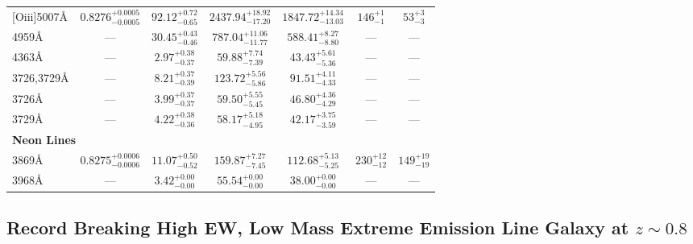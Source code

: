 \documentclass[twocolumn,tight,times,linenumbers]{aastex631}
\newcommand{\oii}{[O{\sc ii}]}
\newcommand{\oiii}{[O{\sc iii}]}
\newcommand{\neiii}{[Ne{\sc iii}]}
\begin{document}
\begin{table}
\begin{tabular*}{\textwidth}{@{\extracolsep{\fill}}lcccccc}
			\oiii5007\AA & $0.8276^{+0.0005}_{-0.0005}$ & $92.12^{+0.72}_{-0.65}$ & $2437.94^{+18.92}_{-17.20}$ & $1847.72^{+14.34}_{-13.03}$ & $146^{+1}_{-1}$ & $53^{+3}_{-3}$ \\
				\oiii4959\AA & --- & $30.45^{+0.43}_{-0.46}$ & $787.04^{+11.06}_{-11.77}$ & $588.41^{+8.27}_{-8.80}$ & --- & --- \\
				\oiii4363\AA & --- & $2.97^{+0.38}_{-0.37}$ & $59.88^{+7.74}_{-7.39}$ & $43.43^{+5.61}_{-5.36}$ & --- & --- \\
				\oii3726,3729\AA & --- & $8.21^{+0.37}_{-0.39}$ & $123.72^{+5.56}_{-5.86}$ & $91.51^{+4.11}_{-4.33}$ & --- & --- \\
				\oii3726\AA & --- & $3.99^{+0.37}_{-0.37}$ & $59.50^{+5.55}_{-5.45}$ & $46.80^{+4.36}_{-4.29}$ & --- & --- \\
				\oii3729\AA & --- & $4.22^{+0.38}_{-0.36}$ & $58.17^{+5.18}_{-4.95}$ & $42.17^{+3.75}_{-3.59}$ & --- & --- \\
				\hline
				\multicolumn{7}{l}{{\textbf{Neon Lines}}}		\\		    	    			    						    		    
				\neiii3869\AA & $0.8275^{+0.0006}_{-0.0006}$ & $11.07^{+0.50}_{-0.52}$ & $159.87^{+7.27}_{-7.45}$ & $112.68^{+5.13}_{-5.25}$ & $230^{+12}_{-12}$ & $149^{+19}_{-19}$ \\
				\neiii3968\AA & --- & $3.42^{+0.00}_{-0.00}$ & $55.54^{+0.00}_{-0.00}$ & $38.00^{+0.00}_{-0.00}$ & --- & --- \\
				\hline
			\end{tabular*}
			\label{table:line_fits}
		\end{table}
		
		\subsection{Record Breaking High EW, Low Mass Extreme Emission Line Galaxy at $z \sim 0.8$}
		
\end{document}
